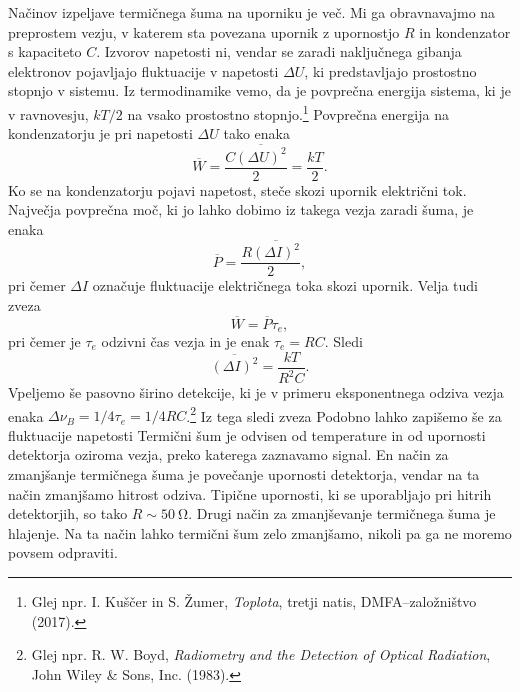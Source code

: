 Načinov izpeljave termičnega šuma na uporniku je več. Mi ga obravnavajmo na preprostem vezju, 
v katerem sta povezana upornik z upornostjo $R$ in kondenzator s kapaciteto $C$. Izvorov 
napetosti ni, vendar se zaradi naključnega gibanja elektronov pojavljajo fluktuacije v 
napetosti $\Delta U$, ki predstavljajo prostostno stopnjo v sistemu.  
Iz termodinamike vemo, da je povprečna energija sistema, ki je v 
ravnovesju, $kT/2$ na vsako prostostno stopnjo.\footnote{Glej
npr. I. Kuščer in S. Žumer, {\it Toplota}, tretji natis, DMFA--založništvo (2017).}
Povprečna energija na kondenzatorju 
je pri napetosti $\Delta U$ tako enaka
\begin{equation}
\overline{W} = \frac{C\overline{(\Delta U)^2}}{2} = \frac{kT}{2}.
\end{equation}
Ko se na kondenzatorju pojavi napetost, steče skozi upornik električni tok. 
Največja povprečna moč, ki jo lahko dobimo iz takega vezja zaradi šuma, je enaka 
\begin{equation}
\overline{P} = \frac{R \overline{(\Delta I)^2}}{2},
\end{equation}
pri čemer $\Delta I$ označuje fluktuacije električnega toka skozi upornik.
Velja tudi zveza
\begin{equation}
\overline{W} = \overline{P}\tau_e,
\end{equation}
pri čemer je $\tau_e$ odzivni čas vezja in je enak $\tau_e = RC$. Sledi 
\begin{equation}
\overline{(\Delta I)^2} = \frac{kT}{R^2C}.
\end{equation}
Vpeljemo še pasovno širino detekcije, ki je v primeru eksponentnega odziva vezja enaka
$\Delta \nu_B = 1/4\tau_e = 1/4RC$.\footnote{Glej npr. R. W. Boyd, 
{\it Radiometry and the Detection of Optical Radiation}, John Wiley \& Sons, Inc. (1983).} 
Iz tega sledi zveza
Podobno lahko zapišemo še za fluktuacije napetosti 
Termični šum je odvisen od temperature in od upornosti detektorja oziroma
vezja, preko katerega zaznavamo signal. En način za zmanjšanje termičnega šuma
je povečanje upornosti detektorja, vendar na ta način zmanjšamo hitrost
odziva. Tipične upornosti, ki se uporabljajo pri hitrih detektorjih, so 
tako $R \sim 50~\si{\ohm}$. Drugi način za zmanjševanje termičnega šuma je
hlajenje. Na ta način lahko termični šum zelo zmanjšamo, nikoli pa ga ne moremo povsem
odpraviti.  

